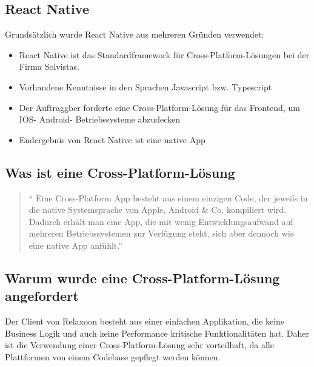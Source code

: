 \begin{spacing}{1}

    \section{React Native}

    Grundsätzlich wurde React Native aus mehreren Gründen verwendet:
    \begin{itemize}
        \item React Native ist das Standardframework für Cross-Platform-Lösungen bei der Firma Solvistas.
        \item Vorhandene Kenntnisse in den Sprachen Javascript bzw. Typescript
        \item Der Auftraggber forderte eine Cross-Platform-Lösung für das Frontend, um IOS- Android- Betriebssysteme abzudecken
        \item Endergebnis von React Native ist eine native App
    \end{itemize}




    \subsection{Was ist eine Cross-Platform-Lösung}

    \begin{quotation}
        ``
        Eine Cross-Platform App besteht aus einem einzigen Code,
        der jeweils in die native Systemsprache von Apple, Android \& Co. kompiliert wird.
        Dadurch erhält man eine App, die mit wenig Entwicklungsaufwand auf mehreren
        Betriebssystemen zur Verfügung steht, sich aber dennoch wie eine native App
        anfühlt.''
        \cite{cross-plattform}

    \end{quotation}


    \subsection{Warum wurde eine Cross-Platform-Lösung angefordert}
    Der Client von Relaxoon besteht aus einer einfachen Applikation, die keine Business Logik
    und auch keine Performance kritische Funktionalitäten hat.
    Daher ist die Verwendung einer Cross-Platform-Lösung sehr vorteilhaft,
    da alle Plattformen von einem Codebase gepflegt werden können.




\end{spacing}

